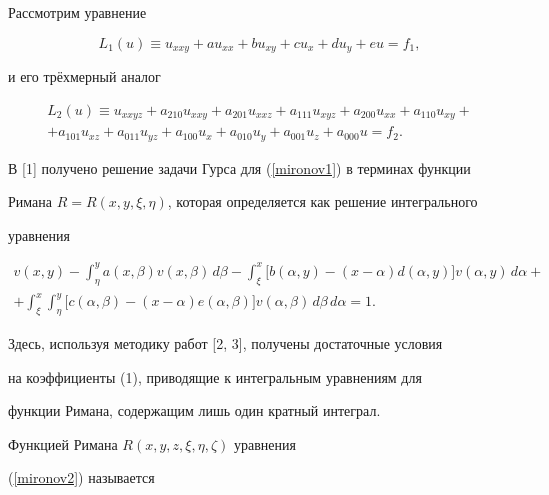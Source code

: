 Рассмотрим уравнение


\begin{equation}\label{mironov1}


L_{1}(u)\equiv u_{xxy}+au_{xx}+bu_{xy}+cu_{x}+du_{y}+eu=f_1,


\end{equation}


и его трёхмерный аналог


\begin{multline}\label{mironov2}


L_{2}(u)\equiv u_{xxyz}+a_{210}u_{xxy}+a_{201}u_{xxz}+a_{111}u_{xyz}


+a_{200}u_{xx}+a_{110}u_{xy}+\\


+a_{101}u_{xz}+a_{011}u_{yz}+a_{100}u_{x}+a_{010}u_{y}


+a_{001}u_{z}+a_{000}u=f_2.


\end{multline}





В [1] получено решение задачи Гурса для (\ref{mironov1}) в терминах функции


Римана $R=R(x,y,\xi,\eta)$, которая определяется как решение интегрального


уравнения


\begin{multline}\label{mironov3}


v(x,y)-\int_{\eta}^{y} a(x,\beta) v(x,\beta) \,d\beta -


\int_{\xi}^{x} \bigl[b(\alpha,y) -(x-\alpha)d(\alpha,y)\bigr]v(\alpha,y)\,d\alpha+\\


+\int_{\xi}^{x} \int_{\eta}^{y} \bigl[c(\alpha,\beta) -(x-\alpha)e(\alpha,\beta)\bigr]


v(\alpha,\beta) \,d\beta \,d\alpha=1.


\end{multline}


Здесь, используя методику работ [2, 3], получены достаточные условия


на коэффициенты (1), приводящие к интегральным уравнениям для


функции Римана, содержащим лишь один кратный интеграл.





Функцией Римана $R(x, y, z, \xi, \eta, \zeta)$ уравнения


(\ref{mironov2}) называется


